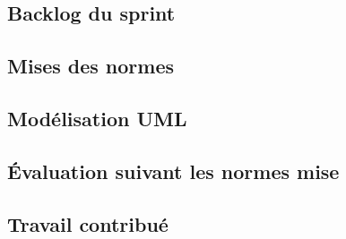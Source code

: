 \subsection{Backlog du sprint}
\subsection{Mises des normes}
\subsection{Modélisation UML}
\subsection{Évaluation suivant les normes mise}
\subsection{Travail contribué}
